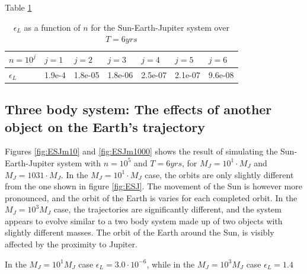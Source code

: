 \documentclass[%
oneside,                 %
final,                   %
10pt]{article}
\begin{document}
Table \ref{tab:ESJtable}
\begin{table}[]
\begin{tabular}{|l|l|l|l|l|l|l|}
\hline
$n=10^j$                                & $j=1$                  & $j=2$                  & $j=3$                  & $j=4$                  & $j=5$                 & $j=6$                 \\ \hline
$\epsilon_L$ & 1.9e-4 & 1.8e-05 & 1.8e-06 & 2.5e-07 & 2.1e-07 & 9.6e-08 \\ \hline
\end{tabular}
\caption{$\epsilon_L$ as a function of $n$ for the Sun-Earth-Jupiter system over $T=6yrs$}
\label{tab:ESJtable}
\end{table}


\subsection{Three body system: The effects of another object on the Earth's trajectory}
Figures \ref{fig:ESJm10} and \ref{fig:ESJm1000} shows the result of simulating the Sun-Earth-Jupiter system with $n=10^5$ and $T=6 yrs$, for $M_J=10^1 \cdot M_J$ and $M_J=1031 \cdot M_J$. In the $M_J=10^1 \cdot M_J$ case, the orbits are only slightly different from the one shown in figure \ref{fig:ESJ}. The movement of the Sun is however more pronounced, and the orbit of the Earth is varies for each completed orbit. In the $M_J=10^3 M_J$ case, the trajectories are significantly different, and the system appears  to evolve similar to a two body system made up of two objects with slightly different masses. The orbit of the Earth around the Sun, is visibly affected by the proximity to Jupiter. \newline

In the $M_J=10^1 M_J$ case $\epsilon_L= 3.0 \cdot 10^{-6}$, while in the $M_J=10^3 M_J$ case $\epsilon_L=1.4$
\end{document}
